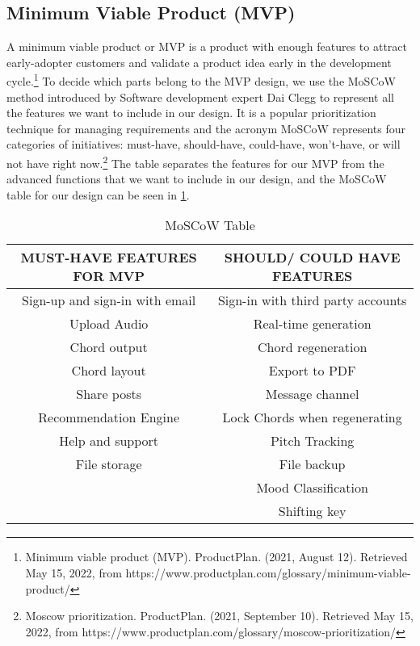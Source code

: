 \subsection{Minimum Viable Product (MVP)}
\label{sec:UImvp}
A minimum viable product or MVP is a product with enough features to attract early-adopter customers and validate a product idea early in the development cycle.\footnote{Minimum viable product (MVP). ProductPlan. (2021, August 12). Retrieved May 15, 2022, from https://www.productplan.com/glossary/minimum-viable-product/} 
To decide which parts belong to the MVP design, we use the MoSCoW method introduced by Software development expert Dai Clegg to represent all the features we want to include in our design. It is a popular prioritization technique for managing requirements and the acronym MoSCoW represents four categories of initiatives: must-have, should-have, could-have, won't-have, or will not have right now.\footnote{Moscow prioritization. ProductPlan. (2021, September 10). Retrieved May 15, 2022, from https://www.productplan.com/glossary/moscow-prioritization/}
The table separates the features for our MVP from the advanced functions that we want to include in our design, and the MoSCoW table for our design can be seen in \cref{moscow}.

\begin{table}[ht]
\centering
\begin{tabular}{ |c|c| } 
 \hline
\textbf{MUST-HAVE FEATURES FOR MVP} & \textbf{SHOULD/ COULD HAVE FEATURES}\\ 
 \hline
 Sign-up and sign-in with email & Sign-in with third party accounts \\ 
 \hline
 Upload Audio & Real-time generation \\ 
 \hline
 Chord output & Chord regeneration \\ 
 \hline
 Chord layout &  Export to PDF \\ 
 \hline
 Share posts & Message channel \\ 
 \hline
 Recommendation Engine &  Lock Chords when regenerating\\ 
 \hline
 Help and support &  Pitch Tracking\\ 
 \hline
 File storage& File backup \\ 
  \hline
 & Mood Classification \\ 
  \hline
 & Shifting key \\ 
 \hline
 \end{tabular}
 \caption{MoSCoW Table}
 \centering
 \label{moscow}
 \end{table}
 
